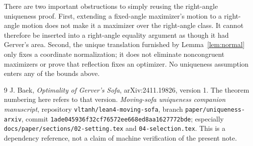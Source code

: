 \documentclass[11pt]{article}
\theoremstyle{remark}\newtheorem{remark}[theorem]{Remark}
\begin{document}
There are two important obstructions to simply reusing the right-angle uniqueness proof. First, extending a fixed-angle maximizer's motion to a right-angle motion does not make it a maximizer over the right-angle class. It cannot therefore be inserted into a right-angle equality argument as though it had Gerver's area. Second, the unique translation furnished by Lemma~\ref{lem:normal} only fixes a coordinate normalization; it does not eliminate noncongruent maximizers or prove that reflection fixes an optimizer. No uniqueness assumption enters any of the bounds above.

\begin{thebibliography}{9}
 J. Baek, \emph{Optimality of Gerver's Sofa}, arXiv:2411.19826, version 1. The theorem numbering here refers to that version.
 \emph{Moving-sofa uniqueness companion manuscript}, repository \texttt{vltanh/lean4-moving-sofa}, branch \texttt{paper/uniqueness-arxiv}, commit \texttt{1ade045936f32cf76572ee668ed8aa1627772bde}; especially \texttt{docs/paper/sections/02-setting.tex} and \texttt{04-selection.tex}. This is a dependency reference, not a claim of machine verification of the present note.
\end{thebibliography}
\end{document}
